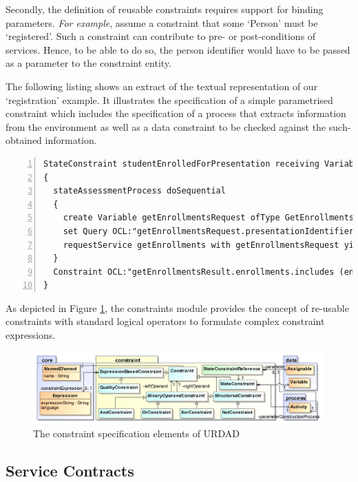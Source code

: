 Secondly, the definition of reusable constraints requires support for binding parameters. \emph{For example}, assume a constraint that some `Person' must be `registered'. Such a constraint can contribute to pre- or post-conditions of services. Hence, to be able to do so, the person identifier would have to be passed as a parameter to the constraint entity. 

The following listing shows an extract of the textual representation of our `registration' example. It illustrates the specification of a simple parametrised constraint which includes the specification of a process that extracts information from the environment as well as a data constraint to be checked against the such-obtained information.
\lstset{language=urdad,caption=Specifying a state constraint in the textual URDAD DSL syntax.,label=constraintTextSyntax}
\begin{lstlisting}[numbers=left,escapechar=|]
StateConstraint studentEnrolledForPresentation receiving Variable enrollForPresentationRequest ofType EnrollForPresentationRequest
{
  stateAssessmentProcess doSequential
  {
    create Variable getEnrollmentsRequest ofType GetEnrollmentsRequest
    set Query OCL:"getEnrollmentsRequest.presentationIdentifier" equalTo Query OCL:"enrollForPresentationRequest.presentationIdentifier"
    requestService getEnrollments with getEnrollmentsRequest yielding Variable getEnrollmentsResult ofType GetEnrollmentsResult
  }
  Constraint OCL:"getEnrollmentsResult.enrollments.includes (enrollForPresentationRequest.personIdentifier)"
}
\end{lstlisting}

As depicted in Figure \ref{fig:constraintModule}, the constraints module provides the concept of re-usable constraints with standard logical operators to formulate complex constraint expressions.
\begin{figure}[Htbp]
  \centering
  \includegraphics{constraint}
  \caption{The constraint specification elements of URDAD}
  \label{fig:constraintModule}
\end{figure}

\subsection{Service Contracts}

